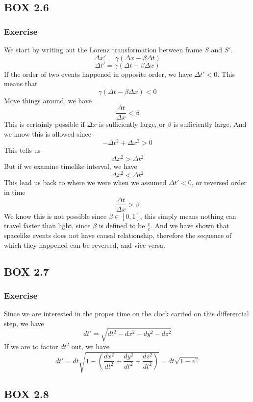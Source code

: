 \documentclass[12pt]{article}
\newcommand{\dydx}[2]{\frac{d #1}{d #2}}
\newcommand{\sqbkt}[1]{\left[ #1 \right]}
\newcommand{\paren}[1]{\left( #1 \right)}
\begin{document}
\subsection{BOX 2.6}
    \subsubsection{Exercise}
    We start by writing out the Lorenz transformation between frame $S$ and $S'$.
    \[
    \Delta x' = \gamma\paren{\Delta x - \beta \Delta t}
    \]
    \[
    \Delta t' = \gamma\paren{\Delta t - \beta \Delta x}
    \]
    If the order of two events happened in opposite order, we have $\Delta t' < 0$. This means that
    \[
    \gamma\paren{\Delta t - \beta \Delta x} < 0
    \]
    Move things around, we have
    \[
    \frac{\Delta t}{\Delta x} < \beta 
    \]
    This is certainly possible if $\Delta x$ is sufficiently large, or $\beta$ is sufficiently large. And we know this is allowed since 
    \[
    -\Delta t^2 + \Delta x^2 > 0
    \]
    This tells us
    \[
    \Delta x^2 > \Delta t^2
    \]
    But if we examine timelike interval, we have
    \[
    \Delta x^2 < \Delta t^2
    \]
    This lead us back to where we were when we assumed $\Delta t' < 0$, or reversed order in time
    \[
    \frac{\Delta t}{\Delta x} > \beta 
    \]
    We know this is not possible since $\beta \in \sqbkt{0,1}$, this simply means nothing can travel faster than light, since $\beta$ is defined to be $\frac{v}{c}$. And we have shown that spacelike events does not have causal relationship, therefore the sequence of which they happened can be reversed, and vice versa. 

    \subsection{BOX 2.7}
        \subsubsection{Exercise}
        Since we are interested in the proper time on the clock carried on this differential step, we have
        \[
        dt' = \sqrt{dt^2 - dx^2 -dy^2 -dz^2}
        \]
        If we are to factor $dt^2$ out, we have
        \[
        dt' = dt\sqrt{1- \paren{\dydx{x^2}{t^2}+\dydx{y^2}{t^2}+\dydx{z^2}{t^2}}} = dt\sqrt{1-v^2}
        \]

    \subsection{BOX 2.8}
\end{document}
